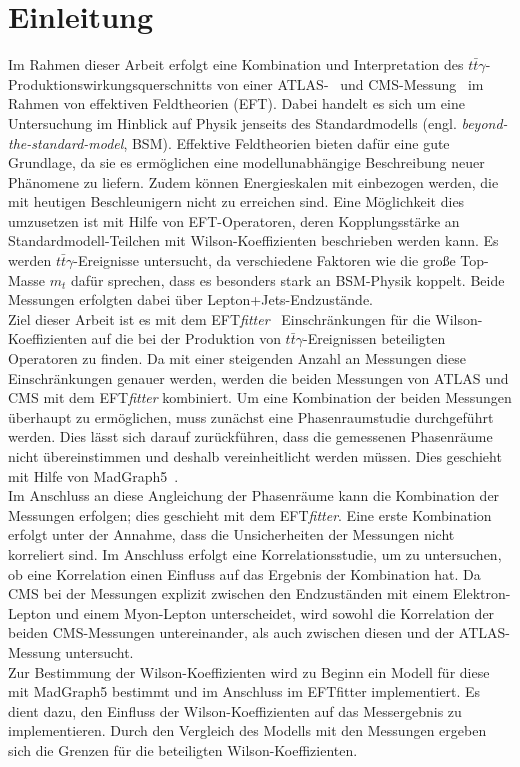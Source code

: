 \chapter{Einleitung}
Im Rahmen dieser Arbeit erfolgt eine Kombination und Interpretation des $t\bar{t}\gamma$-Produktionswirkungsquerschnitts von einer ATLAS-~\cite{Aaboud:2017era} und CMS-Messung~\cite{Sirunyan:2017iyh} im Rahmen von effektiven Feldtheorien (EFT). Dabei handelt es sich um eine Untersuchung im Hinblick auf Physik jenseits des Standardmodells (engl. \textit{beyond-the-standard-model}, BSM). Effektive Feldtheorien bieten dafür eine gute Grundlage, da sie es ermöglichen eine modellunabhängige Beschreibung neuer Phänomene zu liefern. Zudem können Energieskalen mit einbezogen werden, die mit heutigen Beschleunigern nicht zu erreichen sind. Eine Möglichkeit dies umzusetzen ist mit Hilfe von EFT-Operatoren, deren Kopplungsstärke an Standardmodell-Teilchen mit Wilson-Koeffizienten beschrieben werden kann. Es werden $t\bar{t}\gamma$-Ereignisse untersucht, da verschiedene Faktoren wie die große Top-Masse $m_t$ dafür sprechen, dass es besonders stark an BSM-Physik koppelt. Beide Messungen erfolgten dabei über Lepton+Jets-Endzustände.\\
Ziel dieser Arbeit ist es mit dem EFT\textit{fitter}~\cite{Castro:2016jjv} Einschränkungen für die Wilson-Koeffizienten auf die bei der Produktion von $t\bar{t}\gamma$-Ereignissen beteiligten Operatoren zu finden. Da mit einer steigenden Anzahl an Messungen diese Einschränkungen genauer werden, werden die beiden Messungen von ATLAS und CMS mit dem EFT\textit{fitter} kombiniert.
Um eine Kombination der beiden Messungen überhaupt zu ermöglichen, muss zunächst eine Phasenraumstudie durchgeführt werden. Dies lässt sich darauf zurückführen, dass die gemessenen Phasenräume nicht übereinstimmen und deshalb vereinheitlicht werden müssen. Dies geschieht mit Hilfe von MadGraph5~\cite{Alwall:2014hca}.\\
Im Anschluss an diese Angleichung der Phasenräume kann die Kombination der Messungen erfolgen; dies geschieht mit dem EFT\textit{fitter}. Eine erste Kombination erfolgt unter der Annahme, dass die Unsicherheiten der Messungen nicht korreliert sind. Im Anschluss erfolgt eine Korrelationsstudie, um zu untersuchen, ob eine Korrelation einen Einfluss auf das Ergebnis der Kombination hat. Da CMS bei der Messungen explizit zwischen den Endzuständen mit einem Elektron-Lepton und einem Myon-Lepton unterscheidet, wird sowohl die Korrelation der beiden CMS-Messungen untereinander, als auch zwischen diesen und der ATLAS-Messung untersucht.\\
Zur Bestimmung der Wilson-Koeffizienten wird zu Beginn ein Modell für diese mit MadGraph5 bestimmt und im Anschluss im EFTfitter implementiert. Es dient dazu, den Einfluss der Wilson-Koeffizienten auf das Messergebnis zu implementieren. Durch den Vergleich des Modells mit den Messungen ergeben sich die Grenzen für die beteiligten Wilson-Koeffizienten.
